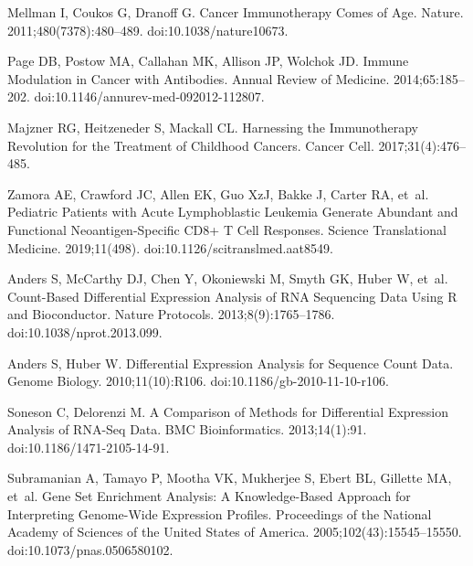 \documentclass[10pt,letterpaper]{article}
\begin{document}
\begin{thebibliography}{10}
	Mellman I, Coukos G, Dranoff G.
	\newblock Cancer Immunotherapy Comes of Age.
	\newblock Nature. 2011;480(7378):480--489.
	\newblock doi:{10.1038/nature10673}.
	
	Page DB, Postow MA, Callahan MK, Allison JP, Wolchok JD.
	\newblock Immune Modulation in Cancer with Antibodies.
	\newblock Annual Review of Medicine. 2014;65:185--202.
	\newblock doi:{10.1146/annurev-med-092012-112807}.
	
	Majzner RG, Heitzeneder S, Mackall CL.
	\newblock Harnessing the Immunotherapy Revolution for the Treatment of
	Childhood Cancers.
	\newblock Cancer Cell. 2017;31(4):476--485.
	
	Zamora AE, Crawford JC, Allen EK, Guo XzJ, Bakke J, Carter RA, et~al.
	\newblock Pediatric Patients with Acute Lymphoblastic Leukemia Generate
	Abundant and Functional Neoantigen-Specific {{CD8}}+ {{T}} Cell Responses.
	\newblock Science Translational Medicine. 2019;11(498).
	\newblock doi:{10.1126/scitranslmed.aat8549}.
	
	Anders S, McCarthy DJ, Chen Y, Okoniewski M, Smyth GK, Huber W, et~al.
	\newblock Count-Based Differential Expression Analysis of {{RNA}} Sequencing
	Data Using {{R}} and {{Bioconductor}}.
	\newblock Nature Protocols. 2013;8(9):1765--1786.
	\newblock doi:{10.1038/nprot.2013.099}.
	
	Anders S, Huber W.
	\newblock Differential Expression Analysis for Sequence Count Data.
	\newblock Genome Biology. 2010;11(10):R106.
	\newblock doi:{10.1186/gb-2010-11-10-r106}.
	
	Soneson C, Delorenzi M.
	\newblock A Comparison of Methods for Differential Expression Analysis of
	{{RNA}}-Seq Data.
	\newblock BMC Bioinformatics. 2013;14(1):91.
	\newblock doi:{10.1186/1471-2105-14-91}.
	
	Subramanian A, Tamayo P, Mootha VK, Mukherjee S, Ebert BL, Gillette MA, et~al.
	\newblock Gene Set Enrichment Analysis: A Knowledge-Based Approach for
	Interpreting Genome-Wide Expression Profiles.
	\newblock Proceedings of the National Academy of Sciences of the United States
	of America. 2005;102(43):15545--15550.
	\newblock doi:{10.1073/pnas.0506580102}.
	

\end{thebibliography}
\end{document}
